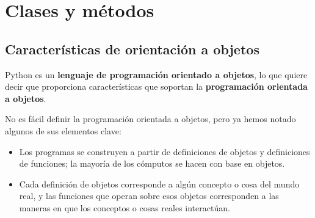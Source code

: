 


\chapter{Clases y métodos}


\section{Características de orientación a objetos}


Python es un {\bf lenguaje de programación orientado a objetos}, 
lo que quiere decir que proporciona características que soportan
la  {\bf programación orientada a objetos}.

No es fácil definir la programación orientada a objetos, pero
ya hemos notado algunos de sus elementos clave:

\begin{itemize}

\item  Los programas se construyen a partir de definiciones
de objetos y definiciones de funciones; la mayoría de los
cómputos se hacen con base en objetos.

\item Cada definición de objetos corresponde a algún 
concepto o cosa del mundo real, y las funciones que operan
sobre esos objetos corresponden a las maneras en que los
conceptos o cosas reales interactúan.

\end{itemize}

